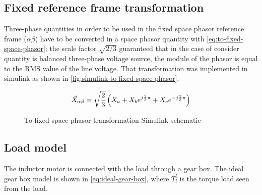 \subsection{Fixed reference frame transformation}\label{subsec:stationary-reference-frame-transformation}

Three-phase quantities in order to be used in the fixed space phasor reference frame ($\alpha\beta$) have to be converted in a space phasor quantity with \autoref{eq:to-fixed-space-phasor}; the scale factor $\sqrt{2/3}$ guaranteed that in the case of consider quantity is balanced three-phase voltage source, the module of the phasor is equal to the RMS value of the line voltage.
That transformation was implemented in simulink as shown in \autoref{fig:simulink-to-fixed-space-phasor}.

\begin{equation}
	\vec{X}_{\alpha\beta} = \sqrt{\frac{2}{3}}\left( X_a + X_b e^{j\frac{2}{3}\pi} + X_c e^{-j\frac{2}{3}\pi}\right)
	\label{eq:to-fixed-space-phasor}
\end{equation}

\begin{figure}[htb]
	\centering
	\qquad
	\caption{To fixed space phasor transformation Simulink schematic}
	\label{fig:simulink-to-fixed-space-phasor}
\end{figure}

\subsection{Load model}

The inductor motor is connected with the load through a gear box.
The ideal gear box model is shown in \autoref{eq:ideal-gear-box}, where $T^l_l$ is the torque load seen from the load.

